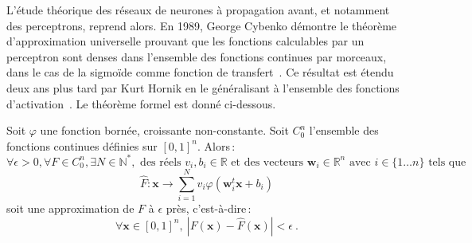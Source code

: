 L'étude théorique des réseaux de neurones à propagation avant, et notamment des perceptrons, reprend alors. En 1989, George Cybenko démontre le théorème d'approximation universelle prouvant que les fonctions calculables par un perceptron sont denses dans l'ensemble des fonctions continues par morceaux, dans le cas de la sigmoïde comme fonction de transfert~\cite{cybenko_approximation_1989}. Ce résultat est étendu deux ans plus tard par Kurt Hornik en le généralisant à l'ensemble des fonctions d'activation~\cite{hornik_approximation_1991}. Le théorème formel est donné ci-dessous.

\begin{theorem}
Soit $\varphi$ une fonction bornée, croissante non-constante. Soit $C_0^n$ l'ensemble des fonctions continues définies sur $[0,1]^n$. Alors\,:
$$\forall \epsilon > 0, \forall F \in C_0^n, \exists N \in \mathbb{N}^{*}, \text{ des réels } v_i, b_i \in \mathbb{R} \text{ et des vecteurs } \mathbf{w}_i \in \mathbb{R}^n \text{ avec } i \in \{1\dots{}n\} \text{ tels que}$$
$$\hat{F} : \mathbf{x} \rightarrow \sum_{i=1}^N v_i \varphi\left(\mathbf{w}_i^t \mathbf{x} + b_i \right)$$
soit une approximation de $F$ à $\epsilon$ près, c'est-à-dire\,:
$$\forall \mathbf{x} \in [0,1]^n, ~\left| F(\mathbf{x}) - \hat{F}(\mathbf{x}) \right| < \epsilon~.$$
\end{theorem}

